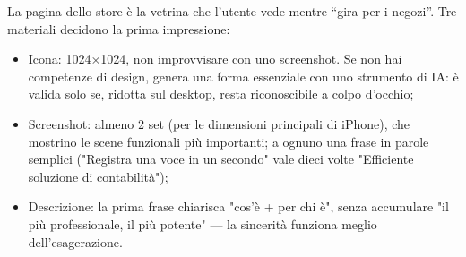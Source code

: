 
La pagina dello store è la vetrina che l'utente vede mentre “gira per i negozi”. Tre materiali decidono la prima impressione:

\begin{itemize}
  \item Icona: 1024×1024, non improvvisare con uno screenshot. Se non hai competenze di design, genera una forma essenziale con uno strumento di IA: è valida solo se, ridotta sul desktop, resta riconoscibile a colpo d'occhio;
  \item Screenshot: almeno 2 set (per le dimensioni principali di iPhone), che mostrino le scene funzionali più importanti; a ognuno una frase in parole semplici ("Registra una voce in un secondo" vale dieci volte "Efficiente soluzione di contabilità");
  \item Descrizione: la prima frase chiarisca "cos'è + per chi è", senza accumulare "il più professionale, il più potente" — la sincerità funziona meglio dell'esagerazione.
\end{itemize}

